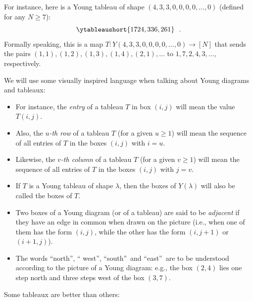For instance, here is a Young tableau of shape $\left(  4,3,3,0,0,0,0,\ldots
,0\right)  $ (defined for any $N\geq7$):%
\[
\ytableaushort{1724,336,261}\ \ .
\]
Formally speaking, this is a map $T:Y\left(  4,3,3,0,0,0,0,\ldots,0\right)
\rightarrow\left[  N\right]  $ that sends the pairs $\left(  1,1\right)
,\left(  1,2\right)  ,\left(  1,3\right)  ,\left(  1,4\right)  ,\left(
2,1\right)  ,\ldots$ to $1,7,2,4,3,\ldots$, respectively.

We will use some visually inspired language when talking about Young diagrams
and tableaux:

\begin{itemize}
\item For instance, the \emph{entry} of a tableau $T$ in box $\left(
i,j\right)  $ will mean the value $T\left(  i,j\right)  $.

\item Also, the $u$\emph{-th row} of a tableau $T$ (for a given $u\geq1$) will
mean the sequence of all entries of $T$ in the boxes $\left(  i,j\right)  $
with $i=u$.

\item Likewise, the $v$\emph{-th column} of a tableau $T$ (for a given
$v\geq1$) will mean the sequence of all entries of $T$ in the boxes $\left(
i,j\right)  $ with $j=v$.

\item If $T$ is a Young tableau of shape $\lambda$, then the boxes of
$Y\left(  \lambda\right)  $ will also be called the boxes of $T$.

\item Two boxes of a Young diagram (or of a tableau) are said to be
\emph{adjacent} if they have an edge in common when drawn on the picture
(i.e., when one of them has the form $\left(  i,j\right)  $, while the other
has the form $\left(  i,j+1\right)  $ or $\left(  i+1,j\right)  $).

\item The words \textquotedblleft north\textquotedblright, \textquotedblleft
west\textquotedblright, \textquotedblleft south\textquotedblright\ and
\textquotedblleft east\textquotedblright\ are to be understood according to
the picture of a Young diagram: e.g., the box $\left(  2,4\right)  $ lies one
step north and three steps west of the box $\left(  3,7\right)  $.
\end{itemize}

Some tableaux are better than others:

